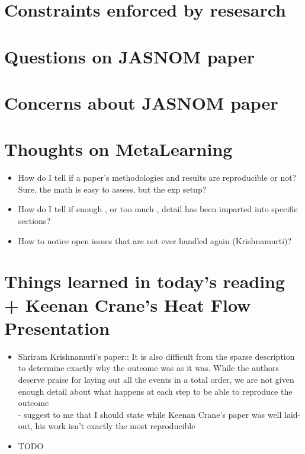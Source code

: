 \documentclass{article}
\begin{document}
\section{Constraints enforced by resesarch}
\begin{itemize}
\end{itemize}

\section{Questions on JASNOM paper}
\begin{itemize}

\end{itemize}

\section{Concerns about JASNOM paper}
\begin{itemize}

\end{itemize}

\section{Thoughts on MetaLearning}
\begin{itemize}
	\item How do I tell if a paper's methodologies and results are reproducible or not? Sure, the math is easy to assess, but the exp setup? 
	\item How do I tell if enough , or too much , detail has been imparted into specific sections?
	\item How to notice open issues that are not ever handled again (Krishnamurti)?
\end{itemize}

\section{Things learned in today's reading + Keenan Crane's Heat Flow Presentation}
\begin{itemize}
	\item Shriram Krishnamuti's paper:: It is also difficult from the sparse description to determine exactly why the outcome was as it was. While the authors deserve praise for laying out all the events in a total order, we are not given enough detail about what happens at each step to be able to reproduce the outcome \\
		- suggest to me that I should state while Keenan Crane's paper was well laid-out, his work isn't exactly the most reproducible
	\item TODO
\end{itemize}
\end{document}
